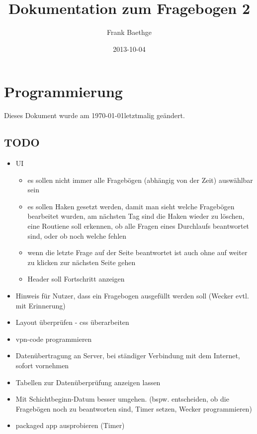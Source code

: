 \documentclass[a4paper]{scrartcl}
\title{Dokumentation zum Fragebogen 2}
\author{Frank Baethge}
\date{2013-10-04}
\begin{document}
	\section{Programmierung}
	Dieses Dokument wurde am \today letztmalig geändert.

		\subsection{TODO}
			\begin{itemize}
				\item UI
					\begin{itemize}
						\item es sollen nicht immer alle Fragebögen (abhängig von der Zeit) auswählbar sein
						\item es sollen Haken gesetzt werden, damit man sieht welche Fragebögen bearbeitet wurden, am nächsten Tag sind die Haken wieder zu löschen, eine Routiene soll erkennen, ob alle Fragen eines Durchlaufs beantwortet sind, oder ob noch welche fehlen
						\item wenn die letzte Frage auf der Seite beantwortet ist auch ohne auf weiter zu klicken zur nächsten Seite gehen
						\item Header soll Fortschritt anzeigen
					\end{itemize}
				\item Hinweis für Nutzer, dass ein Fragebogen ausgefüllt werden soll (Wecker evtl. mit Erinnerung)
				\item Layout überprüfen - css überarbeiten
				\item vpn-code programmieren
				\item Datenübertragung an Server, bei ständiger Verbindung mit dem Internet, sofort vornehmen
				\item Tabellen zur Datenüberprüfung anzeigen lassen
				\item Mit Schichtbeginn-Datum besser umgehen. (bspw. entscheiden, ob die Fragebögen noch zu beantworten sind, Timer setzen, Wecker programmieren)
				\item packaged app ausprobieren (Timer)
			\end{itemize}
\end{document}
